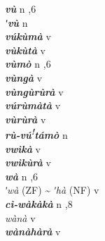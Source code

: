 \begin{multicols}{2}
{{\bfseries\itshape vù}} \relax  n  ,6  \relax   \relax  \\
{{\bfseries\itshape ʹvù}} \relax  n   \relax  {} \relax   \relax  \\
{{\bfseries\itshape vúkùmà}} \relax  v  \relax   \relax  {} \relax   \relax  \\
{{\bfseries\itshape vùkùtà}} \relax  v  \relax   \relax  {} \relax   \relax  \\
{{\bfseries\itshape vùmò}} \relax  n  ,6  \relax   \relax  \\
{{\bfseries\itshape vùngà}} \relax  v  \relax   \relax  {} \relax   \relax  \\
{{\bfseries\itshape vùngùrùrà}} \relax  v  \relax   \relax  {} \relax   \relax  \\
{{\bfseries\itshape vúrùmàtà}} \relax  v  \relax   \relax  {} \relax   \relax  \\
{{\bfseries\itshape vùrùrà}} \relax  v  \relax   \relax  {} \relax   \relax  \\
{{\bfseries\itshape rù-vú\textsuperscript{!}támò}} \relax  n   \relax  {} \relax   \relax  \\
{{\bfseries\itshape vwìkà}} \relax  v  \relax   \relax  {} \relax   \relax  \\
{{\bfseries\itshape vwìkùrà}} \relax  v  \relax   \relax  {} \relax   \relax  \\
{{\bfseries\itshape wà}} \relax  n  ,6  \relax   \relax  \\
{\textit{ʹwà} (ZF) {\textasciitilde} \textit{ʹhà} (NF)} \relax  v  \relax   \relax  {} \relax   \relax  \\
{{\bfseries\itshape cì-wàkàkà}} \relax  n  ,8  \relax   \relax  \\
{\textit{wànà}} \relax  v  \relax   \relax  {} \relax   \relax  \\
{{\bfseries\itshape wànàhàrà}} \relax  v  \relax   \relax  {} \relax   \relax  \\

\end{multicols}
